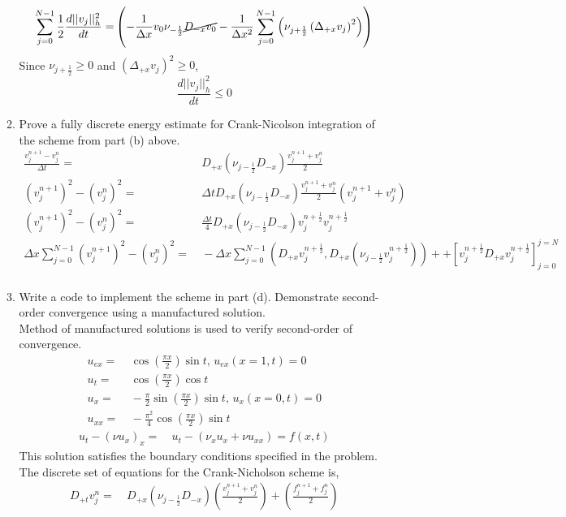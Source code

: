 \documentclass[11pt]{article}
\newcommand{\Dpt}{D_{+t}}
\newcommand{\Dpx}{D_{+x}}
\newcommand{\dpx}{\Delta_{+x}}
\newcommand{\Dmx}{D_{-x}}
\newcommand{\dx}{\Delta x}
\newcommand{\dt}{\Delta t}
\newcommand{\bra}[1]{\left(#1\right)}
\newcommand{\vj}{v_j}
\newcommand{\vnj}{v^n_j}
\newcommand{\vnpj}{v^{n+1}_{j}}
\newcommand{\njmh}{\nu_{j-\frac{1}{2}}}
\newcommand{\njph}{\nu_{j+\frac{1}{2}}}
\newcommand{\dint}[1]{\sum_{j=0}^{N-1}#1}
\newcommand{\h}{\frac{1}{2}}
\begin{document}
\begin{enumerate}
\begin{enumerate}
\begin{align*}
       \dint{\frac{1}{2}\frac{d||\vj||^2_h}{dt}} =& \bra{-\frac{1}{\dx}v_0\nu_{-\frac{1}{2}}\cancel{\Dmx v_0} - \frac{1}{\dx^2}\dint{\bra{\njph\bra{\dpx\vj}^2}}} \\
    \end{align*}
    Since $\njph\geq0$ and $\bra{\dpx\vj}^2\geq0$, 
    \[
    \frac{d||\vj||^2_h}{dt} \leq 0
    \]
    \item {\color{blue}Prove a fully discrete energy estimate for Crank-Nicolson integration of the scheme from part (b) above.}
    \begin{align*}
    \frac{v^{n+1}_j - v^n_j}{\dt} =& \ \Dpx\bra{\nu_{j-\h}\Dmx}\frac{v^{n+1}_j+v^n_j}{2}\\
    \bra{v^{n+1}_j}^2 - \bra{v^n_j}^2 =& \ \dt \Dpx\bra{\nu_{j-\h}\Dmx}\frac{v^{n+1}_j+v^n_j}{2} \bra{v^{n+1}_j+v^n_j} \\
    \bra{v^{n+1}_j}^2 - \bra{v^n_j}^2 =& \ \frac{\dt}{4}\Dpx\bra{\nu_{j-\h}\Dmx}v^{n+\h}_j v^{n+\h}_j \\
    \dx \dint{\bra{v^{n+1}_j}^2 - \bra{v^n_j}^2} =& \ -\dx\dint{\bra{\Dpx v^{n+\h}_j, \Dpx\bra{\nu_{j-\h}v^{n+\h}_j}}}++ \left[v^{n+\h}_j\Dpx v^{n+\h}_j\right]_{j=0}^{j=N}\\
    \end{align*}
    \item {\color{blue}Write a code to implement the scheme in part (d). Demonstrate second-order convergence using a manufactured solution.} \\
    Method of manufactured solutions is used to verify second-order of convergence.
    \begin{align*}
        u_{ex} =& \ \cos{\bra{\frac{\pi x}{2}}}\sin{t}, \, u_{ex}(x=1,t)=0 \\
        u_t =& \ \cos{\bra{\frac{\pi x}{2}}}\cos{t} \\
        u_x =& \ -\frac{\pi}{2}\sin{\bra{\frac{\pi x}{2}}}\sin{t}, \, u_x(x=0,t) = 0 \\
        u_{xx} =& \ -\frac{\pi^2}{4}\cos{\bra{\frac{\pi x}{2}}}\sin{t}
    \end{align*}
    \begin{align*}
        u_t -\bra{\nu u_x}_x =& \ u_t - \bra{\nu_x u_x + \nu u_{xx}} = f(x,t) 
    \end{align*}
    This solution satisfies the boundary conditions specified in the problem. The discrete set of equations for the Crank-Nicholson scheme is, 
    \begin{align*}
        \Dpt \vnj =& \ \Dpx\bra{\njmh\Dmx}\bra{\frac{\vnpj + \vnj}{2}} + \bra{\frac{f^{n+1}_j+f^n_j}{2}} \\

\end{align*}
\end{enumerate}
\end{enumerate}
\end{document}
